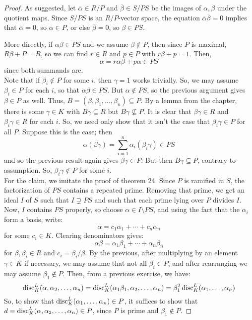 \begin{proof}
	As suggested, let $\overline{\alpha} \in R/P$ and $\overline{\beta} \in S/PS$ be the images of $\alpha,\beta$ under the quotient maps. Since $S/PS$ is an $R/P$-vector space, the equation $\overline{\alpha}\overline{\beta} = 0$ implies that $\overline{\alpha}=0$, so $\alpha \in P$, or else $\overline{\beta}=0$, so $\beta \in PS$.
	
	More directly, if $\alpha\beta \in PS$ and we assume $\beta \notin P$, then since $P$ is maximal, $R\beta + P = R$, so we can find $r \in R$ and $p \in P$ with $r\beta + p = 1$. Then,
	\[ \alpha = r\alpha\beta + p\alpha \in PS \]
	since both summands are. \\
	
	Note that if $\beta_i \notin P$ for some $i$, then $\gamma=1$ works trivially. So, we may assume $\beta_i \in P$ for each $i$, so that $\alpha\beta \in PS$. But $\alpha \notin PS$, so the previous argument gives $\beta \in P$ as well. Thus, $B = (\beta,\beta_1,\ldots,\beta_n) \subseteq P$. By a lemma from the chapter, there is some $\gamma \in K$ with $B\gamma \subseteq R$ but $B\gamma \not\subseteq P$. It is clear that $\beta\gamma \in R$ and $\beta_i\gamma \in R$ for each $i$. So, we need only show that it isn't the case that $\beta_i\gamma \in P$ for all $P$. Suppose this is the case; then
	\[ \alpha(\beta\gamma) = \sum_{i=1}^n \alpha_i(\beta_i\gamma) \in PS \]
	and so the previous result again gives $\beta\gamma \in P$. But then $B\gamma \subseteq P$, contrary to assumption. So, $\beta_i\gamma \notin P$ for some $i$. \\
	
	For the claim, we imitate the proof of theorem 24. Since $P$ is ramified in $S$, the factorization of $PS$ contains a repeated prime. Removing that prime, we get an ideal $I$ of $S$ such that $I \supsetneq PS$ and such that each prime lying over $P$ divides $I$. Now, $I$ contains $PS$ properly, so choose $\alpha \in I \setminus PS$, and using the fact that the $\alpha_i$ form a basis, write:
	\[ \alpha = c_1\alpha_1 + \cdots + c_n\alpha_n \]
	for some $c_i \in K$. Clearing denominators gives:
	\[ \alpha\beta = \alpha_1\beta_1 + \cdots + \alpha_n\beta_n \]
	for $\beta,\beta_i \in R$ and $c_i = \beta_i/\beta$. By the previous, after multiplying by an element $\gamma \in K$ if necessary, we may assume that not all $\beta_i \in P$, and after rearranging we may assume $\beta_1 \notin P$. Then, from a previous exercise, we have:
	\[ \operatorname{disc}_K^L(\alpha,\alpha_2,\ldots,\alpha_n) = \operatorname{disc}_K^L(\alpha_1\beta_1,\alpha_2,\ldots,\alpha_n) = \beta_1^2\operatorname{disc}_K^L(\alpha_1,\ldots,\alpha_n) \]
	So, to show that $\operatorname{disc}_K^L(\alpha_1,\ldots,\alpha_n) \in P$, it suffices to show that $d = \operatorname{disc}_K^L(\alpha,\alpha_2,\ldots,\alpha_n) \in P$, since $P$ is prime and $\beta_1 \notin P$.
	

\end{proof}
